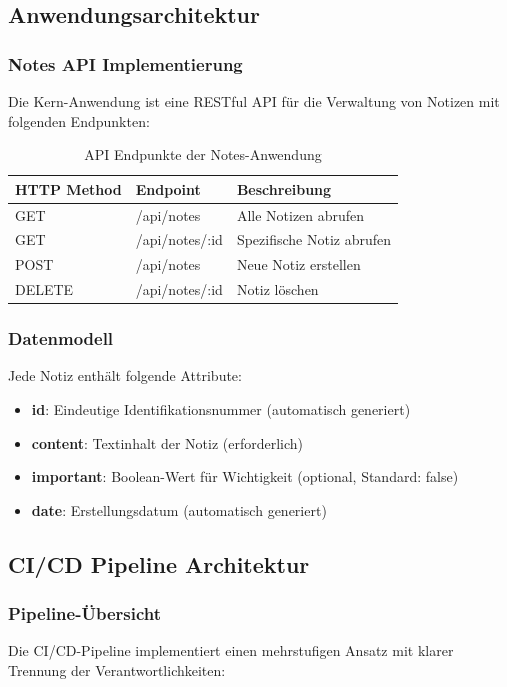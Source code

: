 \subsection{Anwendungsarchitektur}

\subsubsection{Notes API Implementierung}
Die Kern-Anwendung ist eine RESTful API für die Verwaltung von Notizen mit folgenden Endpunkten:

\begin{table}[h!]
    \centering
    \caption{API Endpunkte der Notes-Anwendung}
    \label{tab:api-endpoints}
    \begin{tabular}{|l|l|l|}
    \hline
    \textbf{HTTP Method} & \textbf{Endpoint} & \textbf{Beschreibung} \\ \hline
    GET & /api/notes & Alle Notizen abrufen \\ \hline
    GET & /api/notes/:id & Spezifische Notiz abrufen \\ \hline
    POST & /api/notes & Neue Notiz erstellen \\ \hline
    DELETE & /api/notes/:id & Notiz löschen \\ \hline
    \end{tabular}
\end{table}

\subsubsection{Datenmodell}
Jede Notiz enthält folgende Attribute:
\begin{itemize}
    \item \textbf{id}: Eindeutige Identifikationsnummer (automatisch generiert)
    \item \textbf{content}: Textinhalt der Notiz (erforderlich)
    \item \textbf{important}: Boolean-Wert für Wichtigkeit (optional, Standard: false)
    \item \textbf{date}: Erstellungsdatum (automatisch generiert)
\end{itemize}

\subsection{CI/CD Pipeline Architektur}

\subsubsection{Pipeline-Übersicht}
Die CI/CD-Pipeline implementiert einen mehrstufigen Ansatz mit klarer Trennung der Verantwortlichkeiten:

